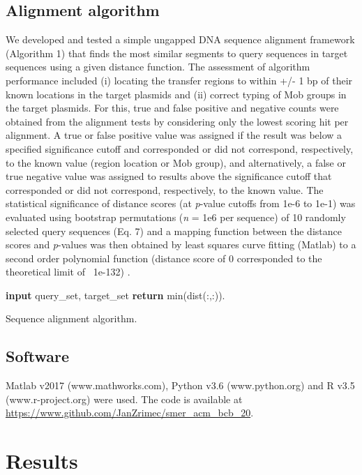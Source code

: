 \documentclass[10pt]{article}
\begin{document}
\subsection{Alignment algorithm}
We developed and tested a simple ungapped DNA sequence alignment framework (Algorithm 1) that finds the most similar segments to query sequences in target sequences using a given distance function. The assessment of algorithm performance included (i) locating the transfer regions to within +/- 1 bp of their known locations in the target plasmids and (ii) correct typing of Mob groups in the target plasmids. For this, true and false positive and negative counts were obtained from the alignment tests by considering only the lowest scoring hit per alignment. A true or false positive value was assigned if the result was below a specified significance cutoff and corresponded or did not correspond, respectively, to the known value (region location or Mob group), and alternatively, a false or true negative value was assigned to results above the significance cutoff that corresponded or did not correspond, respectively, to the known value. The statistical significance of distance scores (at \textit{p}-value cutoffs from 1e-6 to 1e-1) was evaluated using bootstrap permutations (\textit{n} = 1e6 per sequence) of 10 randomly selected query sequences (Eq. 7) and a mapping function between the distance scores and \textit{p}-values was then obtained by least squares curve fitting (Matlab) to a second order polynomial function (distance score of 0 corresponded to the theoretical limit of ~1e-132) \cite{Zrimec2020-wx}. 

\begin{algorithm}
\footnotesize
\SetAlgoLined
 \textbf{input} query\_set, target\_set\;
 \textbf{return} min(dist(:,:)).
 \caption{Sequence alignment algorithm.}
\end{algorithm}

\subsection{Software}
Matlab v2017 (www.mathworks.com), Python v3.6 (www.python.org) and R v3.5 (www.r-project.org) were used. The code is available at \url{https://www.github.com/JanZrimec/smer\_acm\_bcb\_20}.


\section{Results}
\end{document}
